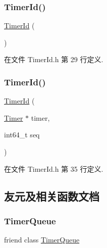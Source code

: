 \subsubsection{\texorpdfstring{Timer\+Id()}{TimerId()}\hspace{0.1cm}{\footnotesize\ttfamily [1/2]}}
{\footnotesize\ttfamily \hyperlink{classmuduo_1_1net_1_1TimerId}{Timer\+Id} (\begin{DoxyParamCaption}{ }\end{DoxyParamCaption})\hspace{0.3cm}{\ttfamily [inline]}}



在文件 Timer\+Id.\+h 第 29 行定义.

\mbox{\label{classmuduo_1_1net_1_1TimerId_a356d897a6fda89a895c95d8e28f35e27}} 
\subsubsection{\texorpdfstring{Timer\+Id()}{TimerId()}\hspace{0.1cm}{\footnotesize\ttfamily [2/2]}}
{\footnotesize\ttfamily \hyperlink{classmuduo_1_1net_1_1TimerId}{Timer\+Id} (\begin{DoxyParamCaption}\item[{\hyperlink{classmuduo_1_1Timer}{Timer} $\ast$}]{timer,  }\item[{int64\+\_\+t}]{seq }\end{DoxyParamCaption})\hspace{0.3cm}{\ttfamily [inline]}}



在文件 Timer\+Id.\+h 第 35 行定义.



\subsection{友元及相关函数文档}
\mbox{\label{classmuduo_1_1net_1_1TimerId_a865df28c10927729363ac18d3d83f35b}} 
\subsubsection{\texorpdfstring{Timer\+Queue}{TimerQueue}}
{\footnotesize\ttfamily friend class \hyperlink{classmuduo_1_1TimerQueue}{Timer\+Queue}\hspace{0.3cm}{\ttfamily [friend]}}



